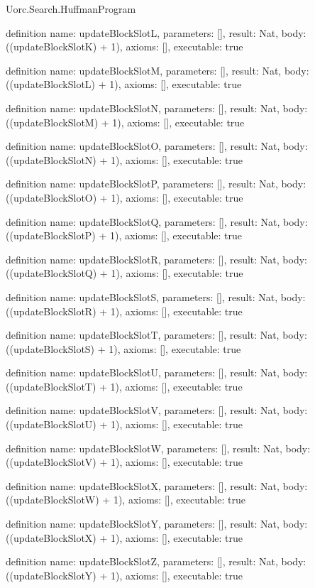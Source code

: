 \begin{lexlean}{Uorc.Search.HuffmanProgram}
\begin{semanticmodule}
definition{
  name: updateBlockSlotL,
  parameters: [],
  result: Nat,
  body: ((updateBlockSlotK) + 1),
  axioms: [],
  executable: true
}

definition{
  name: updateBlockSlotM,
  parameters: [],
  result: Nat,
  body: ((updateBlockSlotL) + 1),
  axioms: [],
  executable: true
}

definition{
  name: updateBlockSlotN,
  parameters: [],
  result: Nat,
  body: ((updateBlockSlotM) + 1),
  axioms: [],
  executable: true
}

definition{
  name: updateBlockSlotO,
  parameters: [],
  result: Nat,
  body: ((updateBlockSlotN) + 1),
  axioms: [],
  executable: true
}

definition{
  name: updateBlockSlotP,
  parameters: [],
  result: Nat,
  body: ((updateBlockSlotO) + 1),
  axioms: [],
  executable: true
}

definition{
  name: updateBlockSlotQ,
  parameters: [],
  result: Nat,
  body: ((updateBlockSlotP) + 1),
  axioms: [],
  executable: true
}

definition{
  name: updateBlockSlotR,
  parameters: [],
  result: Nat,
  body: ((updateBlockSlotQ) + 1),
  axioms: [],
  executable: true
}

definition{
  name: updateBlockSlotS,
  parameters: [],
  result: Nat,
  body: ((updateBlockSlotR) + 1),
  axioms: [],
  executable: true
}

definition{
  name: updateBlockSlotT,
  parameters: [],
  result: Nat,
  body: ((updateBlockSlotS) + 1),
  axioms: [],
  executable: true
}

definition{
  name: updateBlockSlotU,
  parameters: [],
  result: Nat,
  body: ((updateBlockSlotT) + 1),
  axioms: [],
  executable: true
}

definition{
  name: updateBlockSlotV,
  parameters: [],
  result: Nat,
  body: ((updateBlockSlotU) + 1),
  axioms: [],
  executable: true
}

definition{
  name: updateBlockSlotW,
  parameters: [],
  result: Nat,
  body: ((updateBlockSlotV) + 1),
  axioms: [],
  executable: true
}

definition{
  name: updateBlockSlotX,
  parameters: [],
  result: Nat,
  body: ((updateBlockSlotW) + 1),
  axioms: [],
  executable: true
}

definition{
  name: updateBlockSlotY,
  parameters: [],
  result: Nat,
  body: ((updateBlockSlotX) + 1),
  axioms: [],
  executable: true
}

definition{
  name: updateBlockSlotZ,
  parameters: [],
  result: Nat,
  body: ((updateBlockSlotY) + 1),
  axioms: [],
  executable: true
}


\end{semanticmodule}
\end{lexlean}
